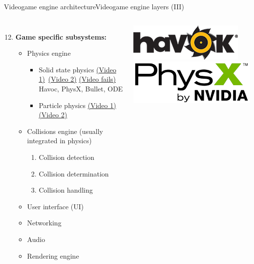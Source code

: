 \documentclass[10pt,compress]{beamer} %
\begin{document}
\begin{frame}[plain]{Videogame engine architecture}{Videogame engine layers (III)}
    \begin{columns}
	\begin{enumerate}
	\setcounter{enumi}{11}
	\item \textbf{Game specific subsystems:} 
		\begin{itemize}
		\item Physics engine
			\begin{itemize}
			\item Solid state physics \href{https://www.youtube.com/watch?v=PfezSJB21vk}{(Video 1)} \href{https://www.youtube.com/watch?v=q0xCYm6B9yE}{(Video 2)} \href{https://www.youtube.com/watch?v=Nj9TGIrgGVI}{(Video fails)}\\
			Havoc, PhysX, Bullet, ODE\\
			\item Particle physics \href{https://www.youtube.com/watch?v=x8Fo2slT2WA}{(Video 1)} \href{https://www.youtube.com/watch?v=Jl54WZtm0QE}{(Video 2)}
			\end{itemize}
		\item Collisions engine (usually integrated in physics)
			\begin{enumerate}[i]
			\item Collision detection
			\item Collision determination
			\item Collision handling
			\end{enumerate}
		\item User interface (UI)
		\item Networking
		\item Audio
		\item Rendering engine
		\end{itemize}
	\end{enumerate}
			\centering\includegraphics[width=0.9\linewidth]{figs/havok}\\\smallskip
			\centering\includegraphics[width=0.9\linewidth]{figs/physx.png}\\\smallskip

\end{columns}
\end{frame}
\end{document}
